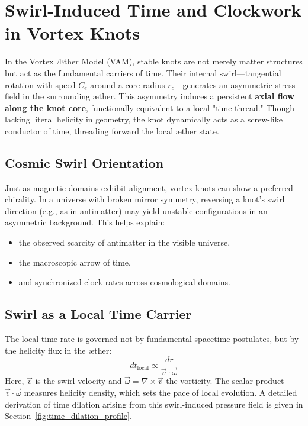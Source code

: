 \section{Swirl-Induced Time and Clockwork in Vortex Knots}

In the Vortex Æther Model (VAM), stable knots are not merely matter structures but act as the fundamental carriers of time. Their internal swirl—tangential rotation with speed \( C_e \) around a core radius \( r_c \)—generates an asymmetric stress field in the surrounding æther. This asymmetry induces a persistent \textbf{axial flow along the knot core}, functionally equivalent to a local "time-thread." Though lacking literal helicity in geometry, the knot dynamically acts as a screw-like conductor of time, threading forward the local æther state.

\subsection*{Cosmic Swirl Orientation}

Just as magnetic domains exhibit alignment, vortex knots can show a preferred chirality. In a universe with broken mirror symmetry, reversing a knot’s swirl direction (e.g., as in antimatter) may yield unstable configurations in an asymmetric background. This helps explain:
\begin{itemize}
    \item the observed scarcity of antimatter in the visible universe,
    \item the macroscopic arrow of time,
    \item and synchronized clock rates across cosmological domains.
\end{itemize}

\subsection*{Swirl as a Local Time Carrier}

The local time rate is governed not by fundamental spacetime postulates, but by the helicity flux in the æther:
\[
    dt_{\text{local}} \propto \frac{dr}{\vec{v} \cdot \vec{\omega}}
\]
Here, \( \vec{v} \) is the swirl velocity and \( \vec{\omega} = \nabla \times \vec{v} \) the vorticity. The scalar product \( \vec{v} \cdot \vec{\omega} \) measures helicity density, which sets the pace of local evolution. A detailed derivation of time dilation arising from this swirl-induced pressure field is given in Section~\ref{fig:time_dilation_profile}.

